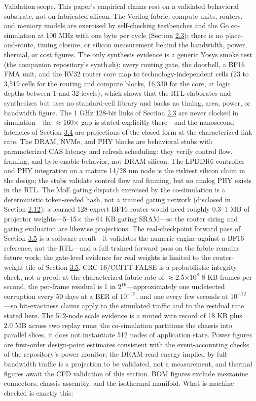 \documentclass[12pt,onecolumn]{article}
\begin{document}
Validation scope. This paper's empirical claims rest on a validated behavioral substrate, not on fabricated silicon. The Verilog fabric, compute units, routers, and memory models are exercised by self-checking testbenches and the Go co-simulation at 100 MHz with one byte per cycle (Section \hyperref[sec:2.3]{2.3}); there is no place-and-route, timing closure, or silicon measurement behind the bandwidth, power, thermal, or cost figures. The only synthesis evidence is a generic Yosys smoke test (the companion repository's synth.sh): every routing gate, the doorbell, a BF16 FMA unit, and the RV32 router core map to technology-independent cells (23 to 3,519 cells for the routing and compute blocks, 16,330 for the core, at logic depths between 1 and 32 levels), which shows that the RTL elaborates and synthesizes but uses no standard-cell library and backs no timing, area, power, or bandwidth figure. The 1 GHz 128-bit links of Section \hyperref[sec:2.3]{2.3} are never clocked in simulation---the $\approx$160$\times$ gap is stated explicitly there---and the nanosecond latencies of Section \hyperref[sec:3.4]{3.4} are projections of the closed form at the characterized link rate. The DRAM, NVMe, and PHY blocks are behavioral stubs with parameterized CAS latency and refresh scheduling: they verify control flow, framing, and byte-enable behavior, not DRAM silicon. The LPDDR6 controller and PHY integration on a mature 14/28 nm node is the riskiest silicon claim in the design; the stubs validate control flow and framing, but no analog PHY exists in the RTL. The MoE gating dispatch exercised by the co-simulation is a deterministic token-seeded hash, not a trained gating network (disclosed in Section \hyperref[sec:2.12]{2.12}); a learned 128-expert BF16 router would need roughly 0.3--1 MB of projector weights---5--15$\times$ the 64 KB gating SRAM---so the router sizing and gating evaluation are likewise projections. The real-checkpoint forward pass of Section \hyperref[sec:3.5]{3.5} is a software result---it validates the numeric engine against a BF16 reference, not the RTL---and a full trained forward pass on the fabric remains future work; the gate-level evidence for real weights is limited to the router-weight tile of Section \hyperref[sec:3.5]{3.5}. CRC-16/CCITT-FALSE is a probabilistic integrity check, not a proof: at the characterized fabric rate of $\approx$2.5$\times10^{8}$ 8 KB frames per second, the per-frame residual is 1 in $2^{16}$---approximately one undetected corruption every 50 days at a BER of $10^{-15}$, and one every few seconds at $10^{-12}$---so bit-exactness claims apply to the simulated traffic and to the residual rate stated here. The 512-node scale evidence is a routed wire record of 18 KB plus 2.0 MB across two replay runs; the co-simulation partitions the chassis into parallel slices, it does not instantiate 512 nodes of application state. Power figures are first-order design-point estimates consistent with the event-accounting checks of the repository's power monitor; the DRAM-read energy implied by full-bandwidth traffic is a projection to be validated, not a measurement, and thermal figures await the CFD validation of this section. BOM figures exclude mezzanine connectors, chassis assembly, and the isothermal manifold. What is machine-checked is exactly this: 
\end{document}
